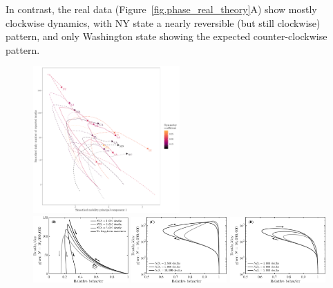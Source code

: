 In contrast, the real data (Figure~\ref{fig.phase_real_theory}A) show mostly clockwise dynamics, with NY state a nearly reversible (but still clockwise) pattern, and only Washington state showing the expected counter-clockwise pattern.
\begin{figure}
\begin{center}
\mbox{\hspace{0.05\textwidth}}
\includegraphics[width=0.5\textwidth]{deaths/national_deaths_metric_phase_pca_grand.pdf}\\
\includegraphics[width=0.325\textwidth]{scripts/figseir_phase2_noname.pdf}
\includegraphics[width=0.325\textwidth]{scripts/figseir_phase2_statefix_noname.pdf}
\includegraphics[width=0.325\textwidth]{scripts/figseir_phase2_state_noname.pdf}

\end{center}
\end{figure}
